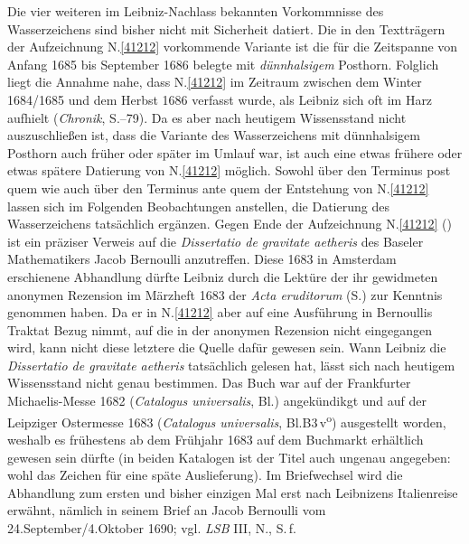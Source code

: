 Die vier weiteren im Leibniz-Nachlass bekannten Vorkommnisse des Wasserzeichens sind bisher nicht mit Sicherheit datiert.
Die in den Textträgern der Aufzeichnung N.\;\ref{41212} vorkommende Variante ist die für die Zeitspanne von Anfang 1685 bis September 1686 belegte mit \textit{dünnhalsigem} Posthorn.
Folglich liegt die Annahme nahe, dass N.\;\ref{41212} im Zeitraum zwischen dem Winter 1684/1685 und dem Herbst 1686 verfasst wurde, als Leibniz sich oft im Harz aufhielt (\textit{Chronik}, S.--79).\cite{01236}
Da es aber nach heutigem Wissensstand nicht auszuschließen ist, dass die Variante des Wasserzeichens mit dünnhalsigem Posthorn auch früher oder später im Umlauf war, ist auch eine etwas frühere oder etwas spätere Datierung von N.\;\ref{41212} möglich.
Sowohl über den Terminus post quem wie auch über den Terminus ante quem der Entstehung von N.\;\ref{41212} lassen sich im Folgenden Beobachtungen anstellen, die Datierung des Wasserzeichens tatsächlich ergänzen.
\pend%
\pstart%
Gegen Ende der Aufzeichnung N.\;\ref{41212} () ist ein präziser Verweis auf die \textit{Dissertatio de gravitate aetheris}\cite{01403} des Baseler Mathematikers Jacob Bernoulli anzutreffen.
Diese 1683 in Amsterdam erschienene Abhandlung dürfte Leibniz durch die Lektüre der ihr gewidmeten anonymen Rezension im Märzheft 1683 der \textit{Acta eruditorum} (S.)\cite{01406} zur Kenntnis genommen haben.
Da er in N.\;\ref{41212} aber auf eine Ausführung in Bernoullis Traktat Bezug nimmt, auf die in der anonymen Rezension nicht eingegangen wird, kann nicht diese letztere die Quelle dafür gewesen sein.
Wann Leibniz die \textit{Dissertatio de gravitate aetheris}\cite{01403} tatsächlich gelesen hat, lässt sich nach heutigem Wissensstand nicht genau bestimmen.
Das Buch war auf der Frankfurter Michaelis-Messe 1682 (\textit{Catalogus universalis}, Bl.\;)\cite{02596} angekündikgt und auf der Leipziger Ostermesse 1683 (\textit{Catalogus universalis}, Bl.\;B3\,v\textsuperscript{o})\cite{02597} ausgestellt worden, weshalb es frühestens ab dem Frühjahr 1683 auf dem Buchmarkt erhältlich gewesen sein dürfte (in beiden Katalogen ist der Titel auch ungenau angegeben: wohl das Zeichen für eine späte Auslieferung).
Im Briefwechsel wird die Abhandlung zum ersten und bisher einzigen Mal erst nach Leibnizens Italienreise erwähnt, nämlich in seinem Brief an Jacob Bernoulli vom 24.\;September/4.\;Oktober 1690; vgl. \textit{LSB} III, N., S.\,f.\cite{01260} %

